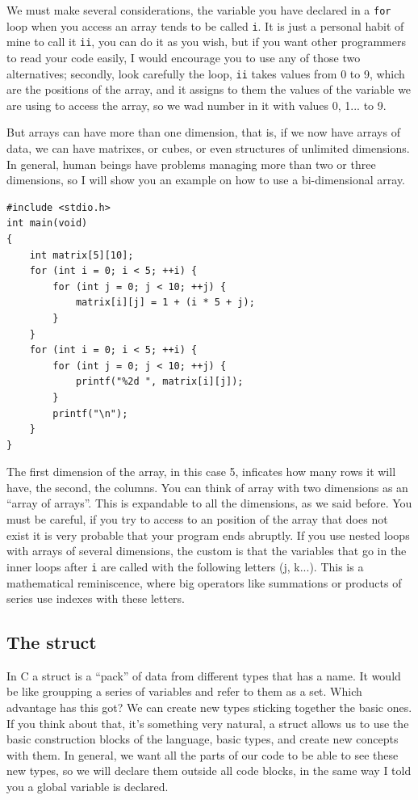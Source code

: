 \documentclass[a4paper]{article}
\begin{document}
We must make several considerations, the variable you have declared in a
\texttt{for} loop when you access an array tends to be called \texttt{i}.
It is just a personal habit of mine to call it \texttt{ii}, you can do it as
you wish, but if you want other programmers to read your code easily, I would
encourage you to use any of those two alternatives; secondly, look carefully
the loop, \texttt{ii} takes values from 0 to 9, which are the positions of
the array, and it assigns to them the values of the variable we are using
to access the array, so we wad number in it with values 0, 1... to 9.

But arrays can have more than one dimension, that is, if we now have arrays of
data, we can have matrixes, or cubes, or even structures of unlimited
dimensions. In general, human beings have problems managing more than two or
three dimensions, so I will show you an example on how to use a bi-dimensional
array.

\noindent
\begin{minipage}[H]{\linewidth}
\mbox{}
\begin{lstlisting}[style=C,
caption={Ejemplo de uso de array bidimensional},
label={lst:bidimensionalArray}]
#include <stdio.h>
int main(void)
{
    int matrix[5][10];
    for (int i = 0; i < 5; ++i) {
        for (int j = 0; j < 10; ++j) {
            matrix[i][j] = 1 + (i * 5 + j);
        }
    }
    for (int i = 0; i < 5; ++i) {
        for (int j = 0; j < 10; ++j) {
            printf("%2d ", matrix[i][j]);
        }
        printf("\n");
    }
}
\end{lstlisting}
\end{minipage}

The first dimension of the array, in this case 5, inficates how many rows
it will have, the second, the columns. You can think of array with two
dimensions as an ``array of arrays''. This is expandable to all the dimensions,
as we said before. You must be careful, if you try to access to an position of
the array that does not exist it is very probable that your program ends
abruptly. If you use nested loops with arrays of several dimensions, the
custom is that the variables that go in the inner loops after \texttt{i} are
called with the following letters (j, k...). This is a mathematical
reminiscence, where big operators like summations or products of series use
indexes with these letters.

\subsection{The struct}
In C a struct is a ``pack'' of data from different types that has a name. It
would be like groupping a series of variables and refer to them as a set.
Which advantage has this got? We can create new types sticking together the
basic ones. If you think about that, it's something very natural, a struct
allows us to use the basic construction blocks of the language, basic types,
and create new concepts with them. In general, we want all the parts of our code
to be able to see these new types, so we will declare them outside all code
blocks, in the same way I told you a global variable is declared.
\end{document}
